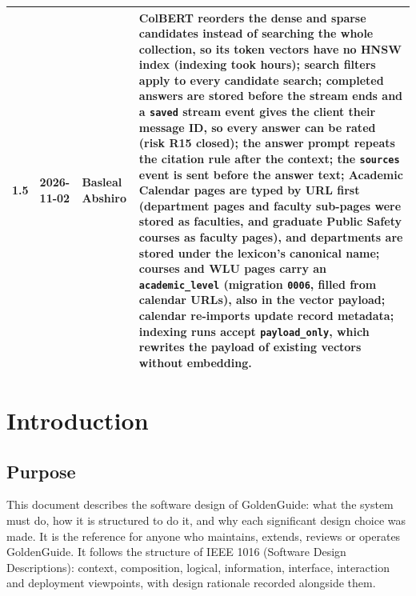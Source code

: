 \documentclass[11pt,letterpaper]{report}
\begin{document}
\begin{tabularx}{\textwidth}{@{}lllL@{}}
1.5 & 2026-11-02 & Basleal Abshiro & ColBERT reorders the dense and sparse candidates instead of searching the whole collection, so its token vectors have no HNSW index (indexing took hours); search filters apply to every candidate search; completed answers are stored before the stream ends and a \texttt{saved} stream event gives the client their message ID, so every answer can be rated (risk R15 closed); the answer prompt repeats the citation rule after the context; the \texttt{sources} event is sent before the answer text; Academic Calendar pages are typed by URL first (department pages and faculty sub-pages were stored as faculties, and graduate Public Safety courses as faculty pages), and departments are stored under the lexicon's canonical name; courses and WLU pages carry an \texttt{academic\_level} (migration \texttt{0006}, filled from calendar URLs), also in the vector payload; calendar re-imports update record metadata; indexing runs accept \texttt{payload\_only}, which rewrites the payload of existing vectors without embedding. \\
\bottomrule
\end{tabularx}

\tableofcontents
\listoffigures
\listoftables

\clearpage
{}
\chapter{Introduction}

\section{Purpose}
This document describes the software design of GoldenGuide: what the system must do, how it is
structured to do it, and why each significant design choice was made. It is the reference for
anyone who maintains, extends, reviews or operates GoldenGuide. It follows the structure of IEEE 1016
(Software Design Descriptions): context, composition, logical, information, interface, interaction
and deployment viewpoints, with design rationale recorded alongside them.
\end{document}
